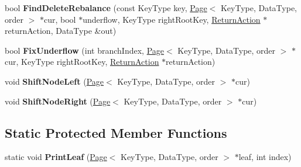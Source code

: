 \begin{DoxyCompactItemize}
\item 
\hypertarget{class_data_structures_1_1_b_plus_tree_a62ad6d18868d637a258a0cd0b26b5e73}{bool {\bfseries Find\-Delete\-Rebalance} (const Key\-Type key, \hyperlink{struct_data_structures_1_1_page}{Page}$<$ Key\-Type, Data\-Type, order $>$ $\ast$cur, bool $\ast$underflow, Key\-Type right\-Root\-Key, \hyperlink{struct_data_structures_1_1_b_plus_tree_1_1_return_action}{Return\-Action} $\ast$return\-Action, Data\-Type \&out)}\label{class_data_structures_1_1_b_plus_tree_a62ad6d18868d637a258a0cd0b26b5e73}

\item 
\hypertarget{class_data_structures_1_1_b_plus_tree_aee940b30b35605a776913b81ebed718f}{bool {\bfseries Fix\-Underflow} (int branch\-Index, \hyperlink{struct_data_structures_1_1_page}{Page}$<$ Key\-Type, Data\-Type, order $>$ $\ast$cur, Key\-Type right\-Root\-Key, \hyperlink{struct_data_structures_1_1_b_plus_tree_1_1_return_action}{Return\-Action} $\ast$return\-Action)}\label{class_data_structures_1_1_b_plus_tree_aee940b30b35605a776913b81ebed718f}

\item 
\hypertarget{class_data_structures_1_1_b_plus_tree_ad6f6b2ccc94f4ec8bf4e5ac5c96a5f67}{void {\bfseries Shift\-Node\-Left} (\hyperlink{struct_data_structures_1_1_page}{Page}$<$ Key\-Type, Data\-Type, order $>$ $\ast$cur)}\label{class_data_structures_1_1_b_plus_tree_ad6f6b2ccc94f4ec8bf4e5ac5c96a5f67}

\item 
\hypertarget{class_data_structures_1_1_b_plus_tree_ae83f0e9a65601d1eb9136fd0c38efb80}{void {\bfseries Shift\-Node\-Right} (\hyperlink{struct_data_structures_1_1_page}{Page}$<$ Key\-Type, Data\-Type, order $>$ $\ast$cur)}\label{class_data_structures_1_1_b_plus_tree_ae83f0e9a65601d1eb9136fd0c38efb80}

\end{DoxyCompactItemize}
\subsection*{Static Protected Member Functions}
\begin{DoxyCompactItemize}
\item 
\hypertarget{class_data_structures_1_1_b_plus_tree_a020c0a1da18064a095707eaa5ce1a55e}{static void {\bfseries Print\-Leaf} (\hyperlink{struct_data_structures_1_1_page}{Page}$<$ Key\-Type, Data\-Type, order $>$ $\ast$leaf, int index)}\label{class_data_structures_1_1_b_plus_tree_a020c0a1da18064a095707eaa5ce1a55e}

\end{DoxyCompactItemize}
